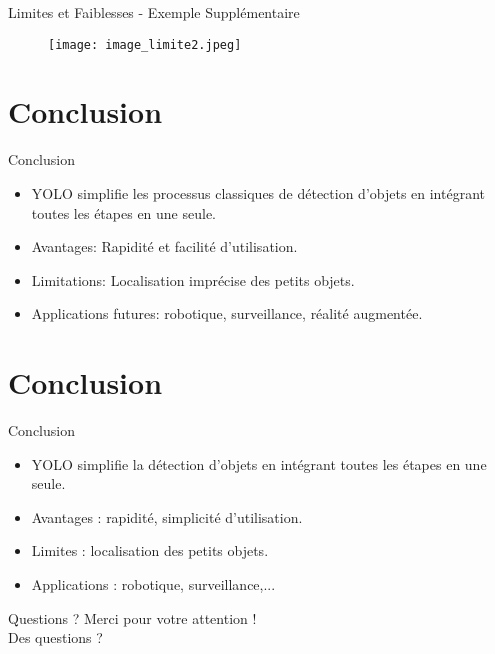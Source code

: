\documentclass{beamer}
\begin{document}
\begin{frame}{Limites et Faiblesses - Exemple Supplémentaire}
    \begin{figure}
        \centering
        \texttt{[image: image\_limite2.jpeg]}
    \end{figure}
\end{frame}



\section{Conclusion}
\begin{frame}{Conclusion}
    \begin{itemize}
        \item YOLO simplifie les processus classiques de détection d'objets en intégrant toutes les étapes en une seule.
        \item Avantages: Rapidité et facilité d'utilisation.
        \item Limitations: Localisation imprécise des petits objets.
        \item Applications futures: robotique, surveillance, réalité augmentée.
    \end{itemize}
\end{frame}

\section{Conclusion}
\begin{frame}{Conclusion}
    \begin{itemize}
        \item YOLO simplifie la détection d'objets en intégrant toutes les étapes en une seule.
        \item Avantages : rapidité, simplicité d'utilisation.
        \item Limites : localisation des petits objets.
        \item Applications : robotique, surveillance,...
    \end{itemize}
\end{frame}




\begin{frame}{Questions ?}
    \centering
    Merci pour votre attention ! \\
    Des questions ?
\end{frame}
\end{document}
